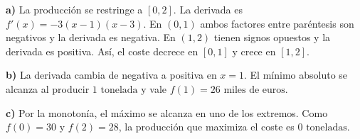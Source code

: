 \textbf{a)} La producción se restringe a $[0,2]$.
La derivada es $f'(x)=-3(x-1)(x-3)$. En $(0,1)$ ambos factores
entre paréntesis son negativos y la derivada es negativa. En $(1,2)$
tienen signos opuestos y la derivada es positiva. Así, el coste
decrece en $[0,1]$ y crece en $[1,2]$.

\textbf{b)} La derivada cambia de negativa a positiva en $x=1$.
El mínimo absoluto se alcanza al producir $\boxed{1\text{ tonelada}}$
y vale $f(1)=\boxed{26\text{ miles de euros}}$.

\textbf{c)} Por la monotonía, el máximo se alcanza en uno de los
extremos. Como $f(0)=30$ y $f(2)=28$, la producción que maximiza
el coste es $\boxed{0\text{ toneladas}}$.
